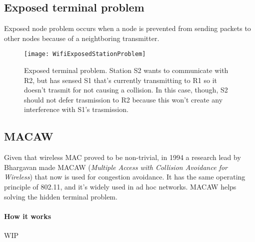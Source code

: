 \subsection{Exposed terminal problem}

Exposed node problem occurs when a node is prevented from sending packets to
other nodes because of a neightboring transmitter.

\begin{figure}[t]
  \centering
  \texttt{[image: WifiExposedStationProblem]}
  \caption{Exposed terminal problem. Station S2 wants to communicate with R2,
    but has sensed S1 that's currently transmitting to R1 so it doesn't
    trasmit for not causing a collision. In this case, though, S2 should not
    defer trasmission to R2 because this won't create any interference with
    S1's trasmission.}
\end{figure}

\subsection{MACAW} 

Given that wireless MAC proved to be non-trivial, in 1994 a research lead by
Bhargavan made MACAW (\textit{Multiple Access with Collision Avoidance for
  Wireless}) that now is used for congestion avoidance. It has the same
operating principle of 802.11, and it's widely used in ad hoc networks.
MACAW helps solving the hidden terminal problem.

\paragraph*{How it works} WIP
